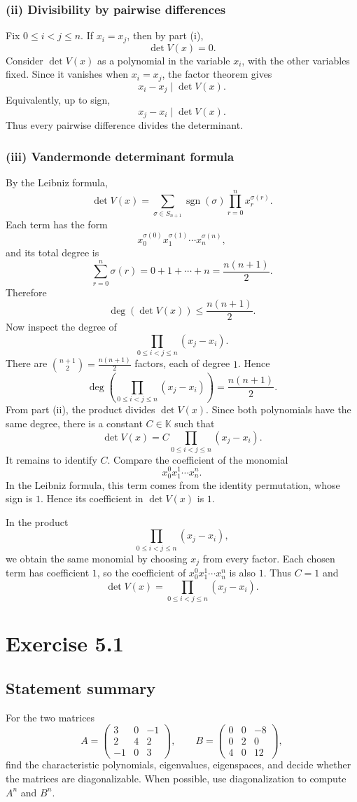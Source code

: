 \documentclass[11pt,a4paper]{article}
\newcommand{\K}{\mathbb{K}}
\begin{document}
\subsubsection*{(ii) Divisibility by pairwise differences}
Fix $0\le i<j\le n$. If $x_i=x_j$, then by part (i),
\[
\det V(x)=0.
\]
Consider $\det V(x)$ as a polynomial in the variable $x_i$, with the other variables fixed. Since it vanishes when $x_i=x_j$, the factor theorem gives
\[
x_i-x_j \mid \det V(x).
\]
Equivalently, up to sign,
\[
x_j-x_i\mid \det V(x).
\]
Thus every pairwise difference divides the determinant.

\subsubsection*{(iii) Vandermonde determinant formula}
By the Leibniz formula,
\[
\det V(x)=\sum_{\sigma\in S_{n+1}}\operatorname{sgn}(\sigma)\prod_{r=0}^{n}x_r^{\sigma(r)}.
\]
Each term has the form
\[
x_0^{\sigma(0)}x_1^{\sigma(1)}\cdots x_n^{\sigma(n)},
\]
and its total degree is
\[
\sum_{r=0}^{n}\sigma(r)=0+1+\cdots+n=\frac{n(n+1)}2.
\]
Therefore
\[
\deg(\det V(x))\le \frac{n(n+1)}2.
\]
Now inspect the degree of
\[
\prod_{0\le i<j\le n}(x_j-x_i).
\]
There are $\binom{n+1}{2}=\frac{n(n+1)}2$ factors, each of degree $1$. Hence
\[
\deg\left(\prod_{0\le i<j\le n}(x_j-x_i)\right)=\frac{n(n+1)}2.
\]
From part (ii), the product divides $\det V(x)$. Since both polynomials have the same degree, there is a constant $C\in\K$ such that
\[
\det V(x)=C\prod_{0\le i<j\le n}(x_j-x_i).
\]
It remains to identify $C$. Compare the coefficient of the monomial
\[
x_0^0x_1^1\cdots x_n^n.
\]
In the Leibniz formula, this term comes from the identity permutation, whose sign is $1$. Hence its coefficient in $\det V(x)$ is $1$.

In the product
\[
\prod_{0\le i<j\le n}(x_j-x_i),
\]
we obtain the same monomial by choosing $x_j$ from every factor. Each chosen term has coefficient $1$, so the coefficient of $x_0^0x_1^1\cdots x_n^n$ is also $1$. Thus $C=1$ and
\[
\boxed{\det V(x)=\prod_{0\le i<j\le n}(x_j-x_i)}.
\]

\newpage
\section*{Exercise 5.1}

\subsection*{Statement summary}
For the two matrices
\[
A=\begin{pmatrix}
3&0&-1\\
2&4&2\\
-1&0&3
\end{pmatrix},
\qquad
B=\begin{pmatrix}
0&0&-8\\
0&2&0\\
4&0&12
\end{pmatrix},
\]
find the characteristic polynomials, eigenvalues, eigenspaces, and decide whether the matrices are diagonalizable. When possible, use diagonalization to compute $A^n$ and $B^n$.
\end{document}
